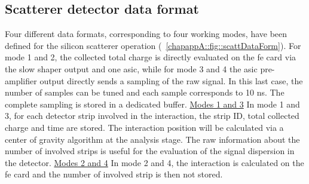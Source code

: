 \subsection{Scatterer detector data format}\label{chapappA::subsec::scattDataFormat}
Four different data formats, corresponding to four working modes, have been defined for the silicon scatterer operation (\figurename~\ref{chapappA::fig::scattDataForm}). For mode 1 and 2, the collected total charge is directly evaluated on the \gls{fe} card via the slow shaper output and one \gls{asic}, while for mode 3 and 4 the \gls{asic} pre-amplifier output directly sends a sampling of the raw signal.  In this last case, the number of samples can be tuned and each sample corresponds to 10 ns. The complete sampling is stored in a dedicated buffer.\newline\newline
\underline{Modes 1 and 3}\newline
In mode 1 and 3, for each detector strip involved in the interaction, the strip ID, total collected charge and time are stored. The interaction position will be calculated via a center of gravity algorithm at the analysis stage. The raw information about the number of involved strips is useful for the evaluation of the signal dispersion in the detector.\newline
\underline{Modes 2 and 4}\newline
In mode 2 and 4, the interaction is calculated on the \gls{fe} card and the number of involved strip is then not stored.\newline

